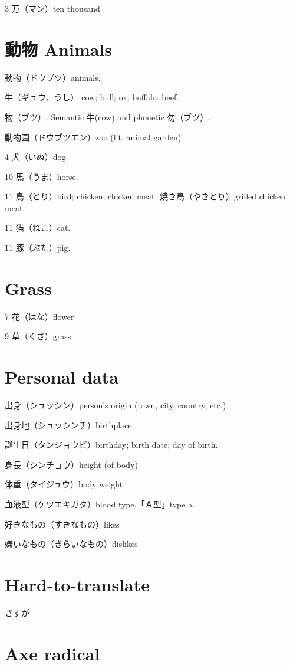3 万（マン）ten thousand

\section{動物 Animals}

動物（ドウブツ）animals.

牛（ギュウ、うし）
cow; bull; ox; buffalo.
beef.

物（ブツ）.
Semantic 牛(cow) and phonetic 勿（ブツ）.

動物園（ドウブツエン）zoo (lit. animal garden)

4 犬（いぬ）dog.

10 馬（うま）horse.

11 鳥（とり）bird; chicken; chicken meat.
焼き鳥（やきとり）grilled chicken meat.

11 猫（ねこ）cat.

11 豚（ぶた）pig.

\section{Grass}

7 花（はな）flower

9 草（くさ）grass

\section{Personal data}

出身（シュッシン）person's origin (town, city, country, etc.)

出身地（シュッシンチ）birthplace

誕生日（タンジョウビ）birthday; birth date; day of birth.

身長（シンチョウ）height (of body)

体重（タイジュウ）body weight

血液型（ケツエキガタ）blood type.「Ａ型」type a.

好きなもの（すきなもの）likes

嫌いなもの（きらいなもの）dislikes

\section{Hard-to-translate}

さすが

\section{Axe radical}

